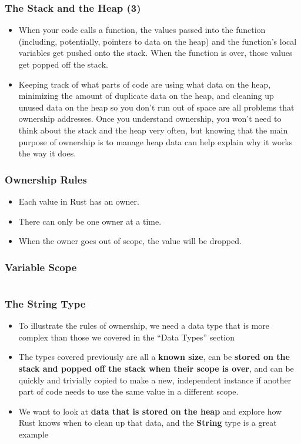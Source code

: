 \documentclass{beamer}
\begin{document}
	
	
	\begin{frame}[fragile]
		\frametitle{The Stack and the Heap (3)}
		\begin{itemize}
			\item 	When your code calls a function, the values passed into the function (including, potentially, pointers to data on the heap) and the function’s local variables get pushed onto the stack. When the function is over, those values get popped off the stack.
			\item 	Keeping track of what parts of code are using what data on the heap, minimizing the amount of duplicate data on the heap, and cleaning up unused data on the heap so you don’t run out of space are all problems that ownership addresses. Once you understand ownership, you won’t need to think about the stack and the heap very often, but knowing that the main purpose of ownership is to manage heap data can help explain why it works the way it does.
		\end{itemize}
	\end{frame}
	
	\begin{frame}[fragile]
		\frametitle{Ownership Rules}
		\begin{itemize}
			\item Each value in Rust has an owner.
			\item There can only be one owner at a time.
			\item When the owner goes out of scope, the value will be dropped.
		\end{itemize}
		
	\end{frame}
	
	\begin{frame}[fragile]
		\frametitle{Variable Scope}
		\inputminted{rust}{./code/scope.rs}
	\end{frame}
	
	\begin{frame}[fragile]
		\frametitle{The String Type}
		\begin{itemize}
			\item To illustrate the rules of ownership, we need a data type that is more complex than those we covered in the “Data Types” section
			\item The types covered previously are all a\textbf{ known size}, can be \textbf{stored on the stack and popped off the stack when their scope is over}, and can be quickly and trivially copied to make a new, independent instance if another part of code needs to use the same value in a different scope. 
			\item We want to look at \textbf{data that is stored on the heap} and explore how Rust knows when to clean up that data, and the \textbf{String} type is a great example
		\end{itemize}
	\end{frame}
	
\end{document}
